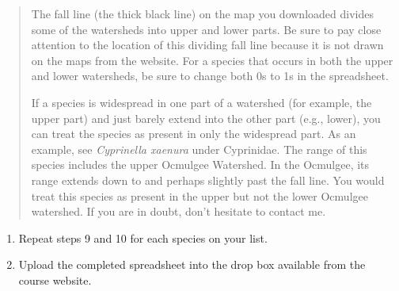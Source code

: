 \documentclass[12pt]{exam}
\begin{document}
\begin{quote}
The fall line (the thick black line) on the map you downloaded 
divides some of the watersheds into upper and lower parts. Be 
sure to pay close attention to the location of this dividing fall 
line because it is not drawn on the maps from the website. For a 
species that occurs in both the upper and lower watersheds, be 
sure to change both 0s to 1s in the spreadsheet.

If a species is widespread in one part of a watershed (for 
example, the upper part) and just barely extend into the other 
part (e.g., lower), you can treat the species as present in only 
the widespread part. As an example, see \emph{Cyprinella xaenura} 
under Cyprinidae. The range of this species includes the upper 
Ocmulgee Watershed. In the Ocmulgee, its range extends down to 
and perhaps slightly past the fall line. You would treat this 
species as present in the upper but not the lower Ocmulgee 
watershed. If you are in doubt, don't hesitate to contact me.
\end{quote}

\begin{enumerate}[resume]
\item
  Repeat steps 9 and 10 for each species on your list.
\item
  Upload the completed spreadsheet into the drop box available 
  from the course website.
\end{enumerate}
\end{document}
